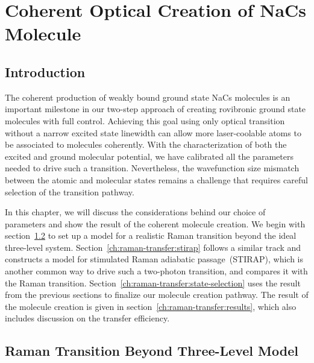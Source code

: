 
\chapter{Coherent Optical Creation of NaCs Molecule}
\label{ch:raman-transfer}

\section{Introduction}
\label{ch:raman-transfer:introduction}

The coherent production of weakly bound ground state NaCs molecules is an important milestone
in our two-step approach of creating rovibronic ground state molecules with full control.
Achieving this goal using only optical transition without a narrow excited state linewidth
can allow more laser-coolable atoms to be associated to molecules coherently.
With the characterization of both the excited and ground molecular potential,
we have calibrated all the parameters needed to drive such a transition.
Nevertheless, the wavefunction size mismatch between the atomic and molecular states
remains a challenge that requires careful selection of the transition pathway.

In this chapter, we will discuss the considerations behind our choice of parameters
and show the result of the coherent molecule creation.
We begin with section~\ref{ch:raman-transfer:raman} to set up a model
for a realistic Raman transition beyond the ideal three-level system.
Section~\ref{ch:raman-transfer:stirap} follows a similar track and constructs a model
for stimulated Raman adiabatic passage~(STIRAP),
which is another common way to drive such a two-photon transition,
and compares it with the Raman transition.
Section~\ref{ch:raman-transfer:state-selection} uses the result from the previous sections
to finalize our molecule creation pathway.
The result of the molecule creation is given in section~\ref{ch:raman-transfer:results},
which also includes discussion on the transfer efficiency.

\section{Raman Transition Beyond Three-Level Model}
\label{ch:raman-transfer:raman}

